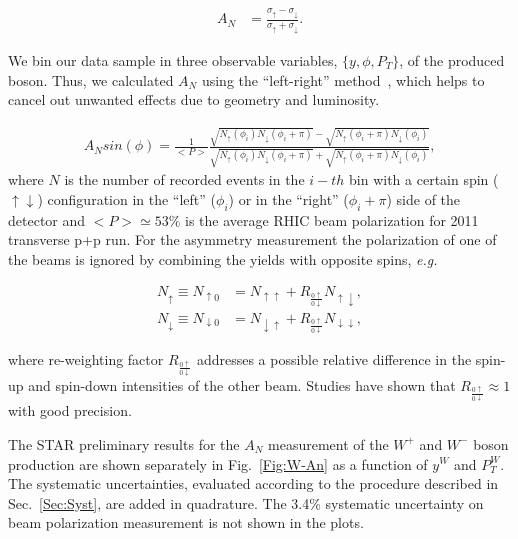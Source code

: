 \documentclass[12pt]{article}
\begin{document}
\begin{align}
\label{eq_anapower}
A_N &= \frac{\sigma_\uparrow - \sigma_\downarrow}{\sigma_\uparrow +
   \sigma_\downarrow}.
\end{align}

We bin our data sample in three observable variables, $\{y, \phi, P_T\}$, of the produced boson. Thus, 
we calculated $A_{N}$ using the ``left-right'' method~\cite{sqrtFormula}, which helps to cancel out unwanted effects due to geometry and luminosity.

\begin{align}
A_{N } sin(\phi)= \frac{1}{<P>}
\frac{\sqrt{N_\uparrow(\phi_i)N_\downarrow(\phi_i+\pi)} - \sqrt{N_\uparrow(\phi_i+\pi)N_\downarrow(\phi_i)} } 
{\sqrt{N_\uparrow(\phi_i)N_\downarrow(\phi_i+\pi)} + \sqrt{N_\uparrow(\phi_i+\pi)N_\downarrow(\phi_i)}},
\end{align}
where $N$ is the number of recorded events in the $i-th$ bin with a certain spin ($\uparrow \downarrow$) configuration in the ``left'' ($\phi_{i}$) or in the ``right'' ($\phi_{i} + \pi$) side of the detector and $<P>\simeq 53\%$ is the average RHIC beam polarization for 2011 transverse p+p run.  
For the asymmetry measurement the polarization of one of the beams is ignored by combining the
yields with opposite spins, \textit{e.g.}

\begin{align}
N_{\uparrow}   \equiv N_{\uparrow0}   &= N_{\uparrow\uparrow}   + R_{\frac{0\uparrow}{0\downarrow}} N_{\uparrow\downarrow},\\
N_{\downarrow} \equiv N_{\downarrow0} &= N_{\downarrow\uparrow} + R_{\frac{0\uparrow}{0\downarrow}} N_{\downarrow\downarrow},
\end{align}

\noindent
where re-weighting factor $R_{\frac{0\uparrow}{0\downarrow}}$ addresses a
possible relative difference in the spin-up and spin-down intensities of the
other beam. Studies have shown that $R_{\frac{0\uparrow}{0\downarrow}} \approx
1$ with good precision.

The STAR preliminary results for the $A_{N}$ measurement of the $W^{+}$ and $W^{-}$ boson production are shown separately in Fig.~\ref{Fig:W-An} as a function of $y^{W}$ and $P_{T}^{W}$. 
The systematic uncertainties, evaluated according to the procedure described in Sec.~\ref{Sec:Syst}, are added in quadrature. 
The 3.4\% systematic uncertainty on beam polarization measurement is not shown in the plots. 
\end{document}
